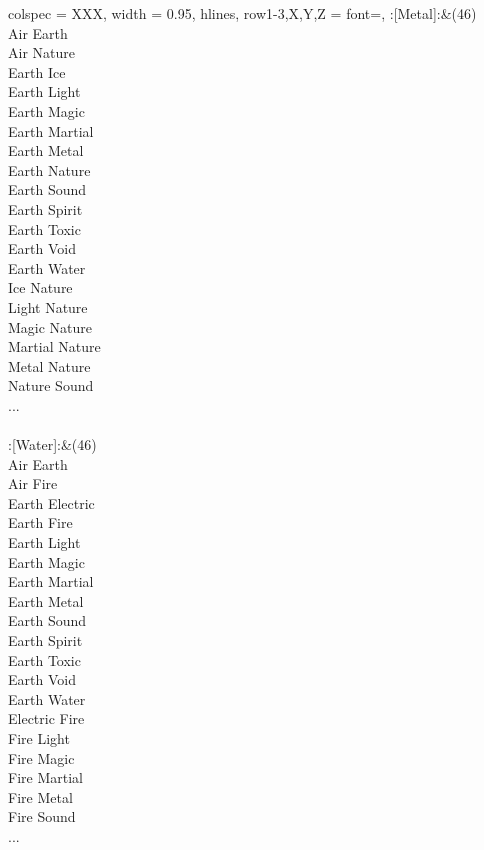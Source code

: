 \begin{longtblr}[
	caption = {1v2 Attacking Effective},
	label = {1v2-Attacking-Effective},
]{
	colspec = {XXX}, width = 0.95\linewidth,
	hlines,
	row{1-3,X,Y,Z} = {font=\bfseries},
}
	:[Metal]:&{(46)\\
	Air Earth \\
	Air Nature \\
	Earth Ice \\
	Earth Light \\
	Earth Magic \\
	Earth Martial \\
	Earth Metal \\
	Earth Nature \\
	Earth Sound \\
	Earth Spirit \\
	Earth Toxic \\
	Earth Void \\
	Earth Water \\
	Ice Nature \\
	Light Nature \\
	Magic Nature \\
	Martial Nature \\
	Metal Nature \\
	Nature Sound \\
	...\\
	}\\

	:[Water]:&{(46)\\
	Air Earth \\
	Air Fire \\
	Earth Electric \\
	Earth Fire \\
	Earth Light \\
	Earth Magic \\
	Earth Martial \\
	Earth Metal \\
	Earth Sound \\
	Earth Spirit \\
	Earth Toxic \\
	Earth Void \\
	Earth Water \\
	Electric Fire \\
	Fire Light \\
	Fire Magic \\
	Fire Martial \\
	Fire Metal \\
	Fire Sound \\
	...\\
	}\\


\end{longtblr}
